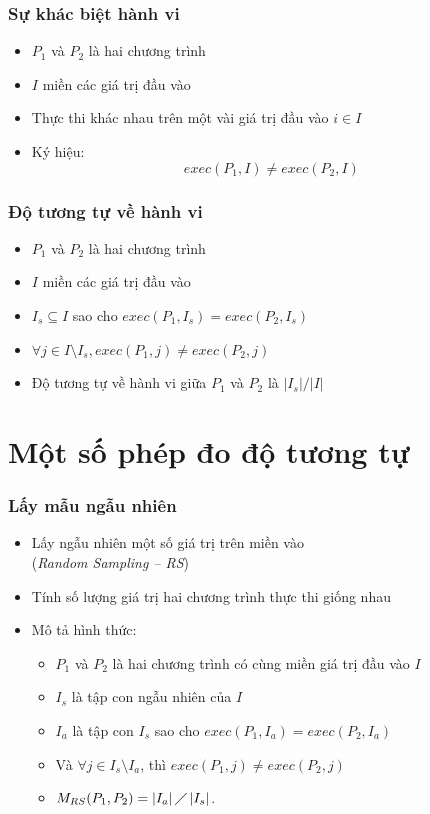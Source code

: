 \documentclass{beamer}
\begin{document}
\begin{frame}
  \frametitle{Sự khác biệt hành vi}
  \begin{itemize}
  	\item $P_{1}$ và $P_{2}$ là hai chương trình
  	\item $I$ miền các giá trị đầu vào 
  	\item Thực thi khác nhau trên một vài giá
  	trị đầu vào $i \in I$
  	\item Ký hiệu: \[exec(P_{1}, I) \neq exec(P_{2}, I)\]
  \end{itemize}

\end{frame}


\begin{frame}
  \frametitle{Độ tương tự về hành vi}
  \begin{itemize}
  	\item $P_{1}$ và $P_{2}$ là hai chương trình
  	\item $I$ miền các giá trị đầu vào 
  	\item $I_{s} \subseteq I$ sao cho
  	$exec(P_{1}, I_{s}) = exec(P_{2}, I_{s})$
  	\item $\forall j \in I \setminus I_{s}, exec(P_{1}, j) \neq exec(P_{2},
  	j)$
  	\item Độ tương tự về hành vi giữa $P_1$ và $P_2$ là $|I_s|/|I|$
  \end{itemize}
\end{frame}


\section{Một số phép đo độ tương tự}
\begin{frame}
  \frametitle{Lấy mẫu ngẫu nhiên}
  \begin{itemize}  	
  	\item Lấy ngẫu nhiên một số giá trị trên miền vào \\(\emph{Random
  		Sampling -- RS})
  	\item Tính số lượng giá trị hai chương trình
  	thực thi giống nhau
  	\item Mô tả hình thức:
  	\begin{itemize}
  		\item $P_{1}$ và $P_{2}$ là hai chương trình có cùng miền giá trị đầu
  		vào $I$
  		\item $I_{s}$ là tập con ngẫu nhiên của $I$
  		\item $I_{a}$ là tập con
  		$I_{s}$ sao cho $exec(P_{1}, I_a) = exec(P_{2}, I_a)$
  		\item Và $\forall j \in I_{s} \setminus I_{a}$, thì
  		$exec(P_{1}, j) \neq exec(P_{2}, j)$
  		\item $M_{RS}(P_{1}, P_{2}) = \left|I_{a}\right| \diagup
  		\left|I_{s}\right| $.
  	\end{itemize}
  \end{itemize}
\end{frame}
\end{document}
